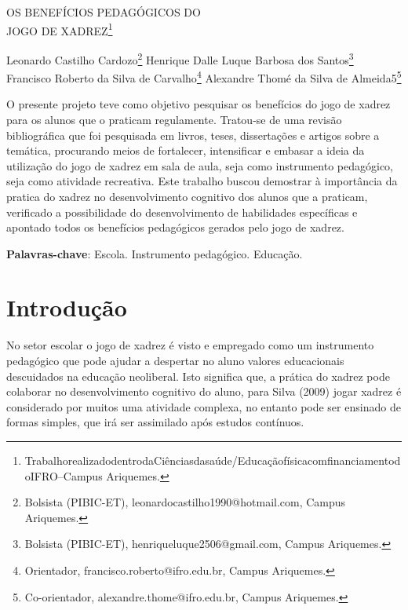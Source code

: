 \documentclass[article,12pt,onesidea,4paper,english,brazil]{abntex2}
\begin{document}
	
	
	\frenchspacing 
	
	\begin{center}
		\LARGE OS BENEFÍCIOS PEDAGÓGICOS DO\\JOGO DE XADREZ\footnote{TrabalhorealizadodentrodaCiênciasdasaúde/EducaçãofísicacomfinanciamentodoIFRO–Campus Ariquemes.}
		
		\normalsize
		Leonardo Castilho Cardozo\footnote{Bolsista (PIBIC-ET), leonardocastilho1990@hotmail.com, Campus Ariquemes.} 
		Henrique Dalle Luque Barbosa dos Santos\footnote{Bolsista (PIBIC-ET), henriqueluque2506@gmail.com, Campus Ariquemes.} 
		Francisco Roberto da Silva de Carvalho\footnote{Orientador, francisco.roberto@ifro.edu.br, Campus Ariquemes.} 
		Alexandre Thomé da Silva de Almeida5\footnote{Co-orientador, alexandre.thome@ifro.edu.br, Campus Ariquemes.} 
	\end{center}
	
	\begin{resumoumacoluna}
		O presente projeto teve como objetivo pesquisar os benefícios do jogo de xadrez para os alunos que o praticam regulamente. Tratou-se de uma revisão bibliográfica que foi pesquisada em livros, teses, dissertações e artigos sobre a temática, procurando meios de fortalecer, intensificar e embasar a ideia da utilização do jogo de xadrez em sala de aula, seja como instrumento pedagógico, seja como atividade recreativa. Este trabalho buscou demostrar à importância da pratica do xadrez no desenvolvimento cognitivo dos alunos que a praticam, verificado a possibilidade do desenvolvimento de habilidades específicas e apontado todos os benefícios pedagógicos gerados pelo jogo de xadrez.
		
		\vspace{\onelineskip}
		
		\noindent
		\textbf{Palavras-chave}: Escola. Instrumento pedagógico. Educação.
	\end{resumoumacoluna}
	
	\section*{Introdução}
	
	No setor escolar o jogo de xadrez é visto e empregado como um instrumento pedagógico que pode ajudar a despertar no aluno valores educacionais descuidados na educação neoliberal. Isto significa que, a prática do xadrez pode colaborar no desenvolvimento cognitivo do aluno, para Silva (2009) jogar xadrez é considerado por muitos uma atividade complexa, no entanto pode ser ensinado de formas simples, que irá ser assimilado após estudos contínuos.
	
\end{document}
